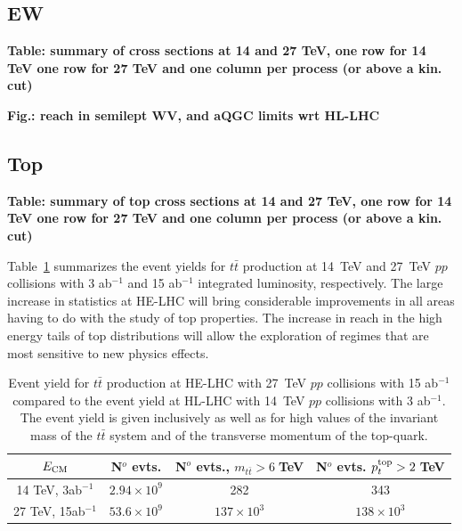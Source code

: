 \documentclass{article}
\begin{document}
\subsection{EW}

{\bf Table: summary of cross sections at 14 and 27 TeV, one row for 14 TeV one row for 27 TeV and one column per process (or above a kin. cut) }



\vspace{5mm}
\noindent
{\bf Fig.: reach in semilept WV, and aQGC limits wrt HL-LHC}



\subsection{Top}

{\bf Table: summary of top cross sections at 14 and 27 TeV, one row for 14 TeV one row for 27 TeV and one column per process (or above a kin. cut) }

Table~\ref{tab:tt_yields} summarizes the event yields for $t\bar{t}$ production at 14~TeV and 27~TeV $pp$ collisions with 3 ab$^{-1}$ and 15 ab$^{-1}$ integrated luminosity, respectively. The large
increase in statistics at HE-LHC will bring considerable improvements in all areas having to do with the study of top properties. The increase in reach in the high energy tails of top distributions
will allow the exploration of regimes that are most sensitive to new physics effects.

\begin{table}[htb]
\caption{Event yield for $t\bar{t}$ production at HE-LHC with 27~TeV $pp$ collisions with 15 ab$^{-1}$ compared to the event yield at HL-LHC with 14~TeV $pp$ collisions with 3 ab$^{-1}$. The event yield is given inclusively as well as for high values of the invariant mass of the $t\bar{t}$ system and of the transverse momentum of the top-quark.}
\label{tab:tt_yields}
\begin{center}
\begin{tabular}{|c         |c           |c        |c       |}
  \hline
  $E_{\rm CM}$ & N$^o$ evts. & N$^o$ evts., $m_{t{\bar{t}}}>6\;$TeV  &  N$^o$ evts.  $p^{\rm top}_{t}>2\;$TeV  \\
  \hline
  14 TeV, 3ab$^{-1} $ & $2.94\times 10^9$    &   282         &      343         \\
  \hline
  27 TeV, 15ab$^{-1}$ &  $53.6\times 10^9$   &  $137\times 10^3$        &     $138\times 10^3$   \\
  \hline
\end{tabular}
\end{center}
\end{table}
\end{document}

